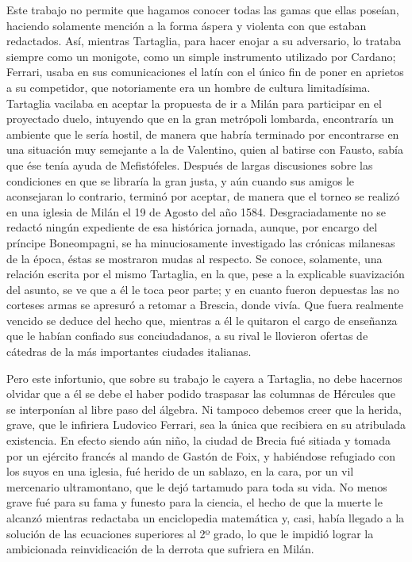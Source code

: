 \documentclass[a4paper, 12pt, draft]{article}
\begin{document}
{Este trabajo no permite que hagamos conocer todas las gamas que ellas poseían, haciendo solamente mención a la forma áspera y violenta con que estaban redactados. Así, mientras Tartaglia, para hacer enojar a su adversario, lo trataba siempre como un monigote, como un simple instrumento utilizado por Cardano; Ferrari, usaba en sus comunicaciones el latín con el único fin de poner en aprietos a su competidor, que notoriamente era un hombre de cultura limitadísima. Tartaglia vacilaba en aceptar la propuesta de ir a Milán para participar en el proyectado duelo, intuyendo que en la gran metrópoli lombarda, encontraría un ambiente que le sería hostil, de manera que habría terminado por encontrarse en una situación muy semejante a la de Valentino, quien al batirse con Fausto, sabía que ése tenía ayuda de Mefistófeles. Después de largas discusiones sobre las condiciones en que se libraría la gran justa, y aún cuando sus amigos le aconsejaran lo contrario, terminó por aceptar, de manera que el torneo se realizó en una iglesia de Milán el 19 de Agosto del año 1584. Desgraciadamente no se redactó ningún expediente de esa histórica jornada,
aunque, por encargo del príncipe Boneompagni, se  ha minuciosamente investigado las crónicas milanesas de la época, éstas se mostraron mudas al respecto. Se conoce, solamente, una relación escrita por el mismo Tartaglia, en la que, pese a la explicable suavización del asunto, se ve que a él le toca peor parte; y en cuanto fueron depuestas las no corteses armas se apresuró a retomar a Brescia, donde vivía. Que fuera realmente vencido se deduce del hecho que, mientras a él le quitaron el cargo de enseñanza que le habían confiado sus conciudadanos, a su rival le llovieron ofertas de cátedras de la más importantes ciudades italianas.

Pero este infortunio, que sobre su trabajo le cayera a Tartaglia, no debe hacernos olvidar que a él se debe el haber podido traspasar las columnas de Hércules que se interponían al libre paso del álgebra. Ni tampoco debemos creer que la herida, grave, que le infiriera Ludovico Ferrari, sea la única que recibiera en su atribulada existencia. En efecto siendo aún niño, la ciudad de Brecia fué sitiada y tomada por un ejército francés al mando de Gastón de Foix, y habiéndose refugiado con los suyos en una iglesia, fué herido de un sablazo, en la cara, por un vil mercenario ultramontano, que le dejó tartamudo para toda su vida. No menos grave fué para su fama y funesto para la ciencia, el hecho de que la muerte le alcanzó mientras redactaba un enciclopedia matemática y, casi, había llegado a la solución de las ecuaciones superiores al 2º grado, lo que le impidió lograr la ambicionada reinvidicación de la derrota que sufriera en Milán.


}
\end{document}
